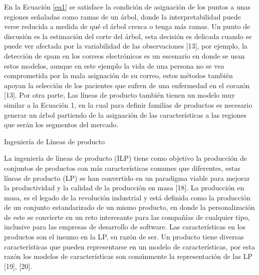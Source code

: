 En la Ecuación \ref{eq1} se satisface la condición de asignación de los puntos a unas regiones señaladas como ramas de un árbol, donde la interpretabilidad puede verse reducida a medida de qué el árbol crezca o tenga más ramas. Un punto de discusión es la estimación del corte del árbol, esta decisión es delicada cuando se puede ver afectada por la variabilidad de las observaciones [13], por ejemplo, la detección de spam en los correos electrónicos es un escenario en donde se usan estos modelos, aunque en este ejemplo la vida de una persona no se vea comprometida por la mala asignación de su correo, estos métodos también apoyan la selección de los pacientes que sufren de una enfermedad en el corazón [13]. Por otra parte, Las líneas de producto también tienen un modelo muy similar a la Ecuación 1, en la cual para definir familias de productos es necesario generar un árbol partiendo de la asignación de las características a las regiones que serán los segmentos del mercado.

Ingeniería de Líneas de producto

La ingeniería de líneas de producto (ILP) tiene como objetivo la producción de conjuntos de productos con más características comunes que diferentes, estas líneas de producto (LP) se han convertido en un paradigma viable para mejorar la productividad y la calidad de la producción en masa [18]. La producción en masa, es el legado de la revolución industrial y está definida como la producción de un conjunto estandarizado de un mismo producto, en donde la personalización de este se convierte en un reto interesante para las compañías de cualquier tipo, inclusive para las empresas de desarrollo de software. Las características en los productos son el insumo en la LP, su razón de ser. Un producto tiene diversas características que pueden representarse en un modelo de características, por esta razón los modelos de características son comúnmente la representación de las LP [19], [20].

